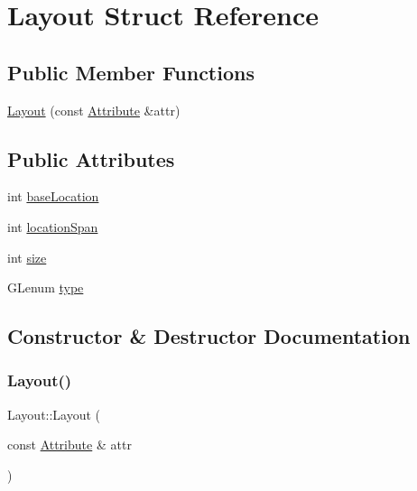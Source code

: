 \hypertarget{struct_layout}{}\section{Layout Struct Reference}
\label{struct_layout}
\subsection*{Public Member Functions}
\begin{DoxyCompactItemize}
\item 
\hyperlink{struct_layout_a1239c2d12968bcfd073571e91e01f30a}{Layout} (const \hyperlink{structpixel_1_1graphics_1_1_attribute}{Attribute} \&attr)
\end{DoxyCompactItemize}
\subsection*{Public Attributes}
\begin{DoxyCompactItemize}
\item 
int \hyperlink{struct_layout_a7f928bc38185dc8527b16f2dd35191cf}{base\+Location}
\item 
int \hyperlink{struct_layout_a483e349db82792cfbd393797c2396957}{location\+Span}
\item 
int \hyperlink{struct_layout_a143bf56c3c9785cc75e2360dbe818e84}{size}
\item 
G\+Lenum \hyperlink{struct_layout_a039d56a72da89806f7019c12c8ab3ea7}{type}
\end{DoxyCompactItemize}


\subsection{Constructor \& Destructor Documentation}
\mbox{\label{struct_layout_a1239c2d12968bcfd073571e91e01f30a}} 
\subsubsection{\texorpdfstring{Layout()}{Layout()}}
{\footnotesize\ttfamily Layout\+::\+Layout (\begin{DoxyParamCaption}\item[{const \hyperlink{structpixel_1_1graphics_1_1_attribute}{Attribute} \&}]{attr }\end{DoxyParamCaption})\hspace{0.3cm}{\ttfamily [explicit]}}



